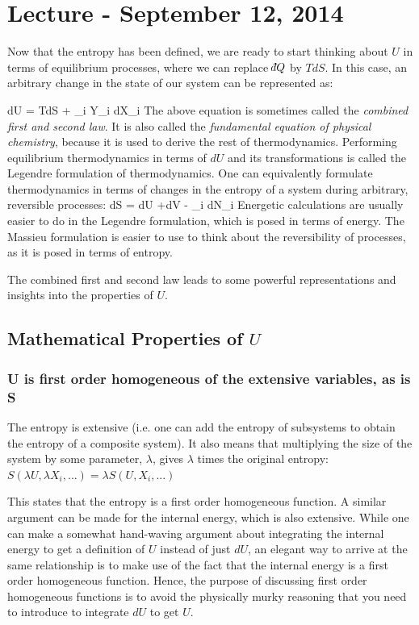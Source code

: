 \documentclass[12pt]{article}
\def\dbar{{\mathchar'26\mkern-12mu d}}
\begin{document}
\section{Lecture - September 12, 2014}
Now that the entropy has been defined, we are ready to start thinking about $U$ in terms of equilibrium processes, where we can replace $\dbar Q$ by $TdS$. In this case, an arbitrary change in the state of our system can be represented as:

\eqs
dU = TdS + \sum_i Y_i dX_i
\eqe
The above equation is sometimes called the \emph{combined first and second law}. It is also called the \emph{fundamental equation of physical chemistry}, because it is used to derive the rest of thermodynamics. Performing equilibrium thermodynamics in terms of $dU$ and its transformations is called the Legendre formulation of thermodynamics. One can equivalently formulate thermodynamics in terms of changes in the entropy of a system during arbitrary, reversible processes:
\eqs
dS = dU +dV - \sum_i dN_i
\eqe
Energetic calculations are usually easier to do in the Legendre formulation, which is posed in terms of energy. The Massieu formulation is easier to use to think about the reversibility of processes, as it is posed in terms of entropy.

The combined first and second law leads to some powerful representations and insights into the properties of $U$.

\subsection{Mathematical Properties of $U$}
\subsubsection{U is first order homogeneous of the extensive variables, as is S}
The entropy is extensive (i.e. one can add the entropy of subsystems to obtain the entropy of a composite system). It also means that multiplying the size of the system by some parameter, $\lambda$, gives $\lambda$ times the original entropy: 
$S(\lambda U, \lambda X_i,...)=\lambda S(U,X_i,...)$

This states that the entropy is a first order homogeneous function. A similar argument can be made for the internal energy, which is also extensive. While one can make a somewhat hand-waving argument about integrating the internal energy to get a definition of $U$ instead of just $dU$, an elegant way to arrive at the same relationship is to make use of the fact that the internal energy is a first order homogeneous function. Hence, the purpose of discussing first order homogeneous functions is to avoid the physically murky reasoning that you need to introduce to integrate $dU$ to get $U$.
\end{document}
